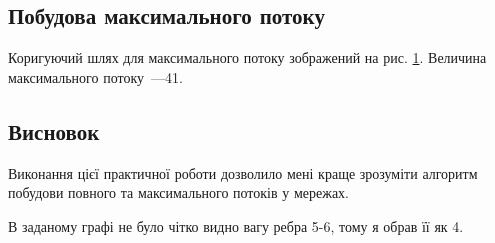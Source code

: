 \documentclass[14pt]{extreport}
\begin{document}
\subsection*{Побудова максимального потоку}

Коригуючий шлях для
максимального потоку
зображений на рис. \ref{max}.
Величина максимального потоку~---41.


\begin{figure}[h]
	\centering
	
	\caption{}
	\label{max}
\end{figure}

\subsection*{Висновок}

Виконання цієї практичної роботи дозволило
мені краще зрозуміти алгоритм побудови повного
та максимального потоків у мережах.

В заданому графі не було чітко видно вагу ребра 5-6, тому я обрав її як 4.
\end{document}
